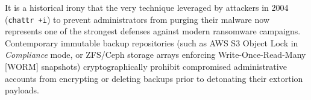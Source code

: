 \begin{perspectiva20}
It is a historical irony that the very technique leveraged by attackers in 2004 (\texttt{chattr +i}) to prevent administrators from purging their malware now represents one of the strongest defenses against modern ransomware campaigns. Contemporary immutable backup repositories (such as AWS S3 Object Lock in \textit{Compliance} mode, or ZFS/Ceph storage arrays enforcing Write-Once-Read-Many [WORM] snapshots) cryptographically prohibit compromised administrative accounts from encrypting or deleting backups prior to detonating their extortion payloads.
\end{perspectiva20}
